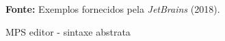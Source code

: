 \begin{figure}[h!]
\centering

\caption{\textmd{MPS editor - sintaxe abstrata}}
\label{fig:mpseditor}

\par\medskip\textbf{Fonte:} Exemplos fornecidos pela \textit{JetBrains} (2018). \par\medskip
\end{figure}
